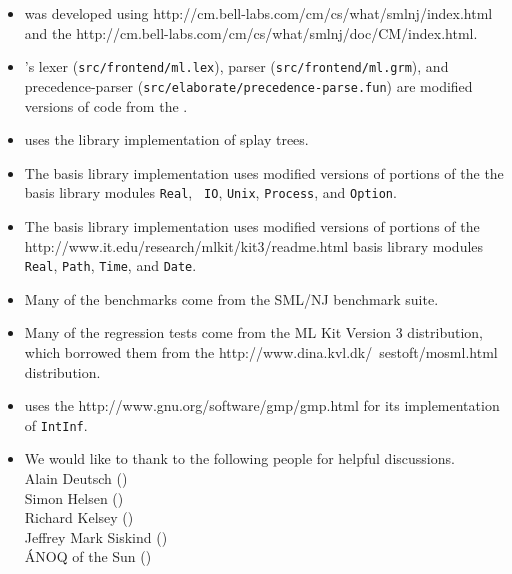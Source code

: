 \begin{itemize}
\item
{\mlton} was developed using
		  {http://cm.bell-labs.com/cm/cs/what/smlnj/index.html}
and the
		  {http://cm.bell-labs.com/cm/cs/what/smlnj/doc/CM/index.html}.

\item
{\mlton}'s lexer ({\tt src/frontend/ml.lex}), 
parser ({\tt src/frontend/ml.grm}),
and precedence-parser ({\tt src/elaborate/precedence-parse.fun})
are modified versions of code from the {\smlnj}.

\item
{\mlton} uses the {\smlnj} library implementation of splay trees.

\item
The {\mlton} basis library implementation uses modified versions of
portions of the the {\smlnj} basis library modules {\tt Real}, {\tt
IO}, {\tt Unix}, {\tt Process}, and {\tt Option}.

\item
The {\mlton} basis library implementation uses modified versions of
portions of the
		  {http://www.it.edu/research/mlkit/kit3/readme.html}
basis library modules {\tt Real}, {\tt Path}, {\tt Time}, and
{\tt Date}.

\item
Many of the benchmarks come from the SML/NJ benchmark suite.

\item
Many of the regression tests come from the ML Kit Version 3 distribution, which
borrowed them from the
		  {http://www.dina.kvl.dk/~sestoft/mosml.html}
distribution.

\item
{\mlton} uses the
		  {http://www.gnu.org/software/gmp/gmp.html}
for its implementation of {\tt IntInf}.

\item
We would like to thank to the following people for helpful discussions.\\
\hspace*{2em}Alain Deutsch ()\\
\hspace*{2em}Simon Helsen ()\\
\hspace*{2em}Richard Kelsey ()\\
\hspace*{2em}Jeffrey Mark Siskind ()\\
\hspace*{2em}\'{A}NOQ of the Sun ()
\end{itemize}
